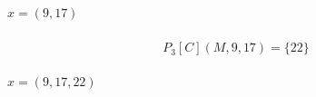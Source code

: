 \begin{minipage}[t]{8cm}
    \begin{minipage}{4cm}
        \centering
        \vspace{0.7mm}
        $x=(9,17)$
        \begin{graybox}
            \setlength{\abovedisplayskip}{0pt}
            \setlength{\belowdisplayskip}{0pt}
            \vspace{-0.5em}
            \begin{gather*}
                \\[-3.75mm]
                P_3[C](M,9,17)=\{22\}
                \\[-3.75mm]
            \end{gather*}
        \end{graybox}
        \vspace{-0.75em}
        {\Huge{}}
    \end{minipage}

    \vspace{0.5mm}
    {\large $x=(9,17,22)$}
\end{minipage}